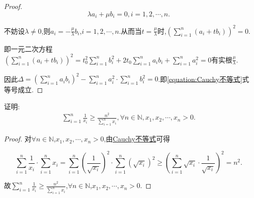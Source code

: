 \documentclass[lang=cn,newtx,10pt,scheme=chinese]{elegantbook}
\begin{document}
\begin{proof}
\[
\lambda a_i + \mu b_i = 0,  i = 1,2,\cdots,n.
\]

不妨设\(\lambda \neq 0\),则\(a_i = -\frac{\mu}{\lambda}b_i\),\(i = 1,2,\cdots,n\).从而当\(t = \frac{\mu}{\lambda}\)时,\(\left(\sum\limits_{i = 1}^{n}(a_i + tb_i)\right)^2 = 0\).

即一元二次方程\(\left(\sum\limits_{i = 1}^{n}(a_i + tb_i)\right)^2 = t_{0}^{2}\sum\limits_{i = 1}^{n}b_{i}^{2} + 2t_0\sum\limits_{i = 1}^{n}a_ib_i + \sum\limits_{i = 1}^{n}a_{i}^{2} = 0\)有实根\(\frac{\mu}{\lambda}\).

因此\(\Delta = \left(\sum\limits_{i = 1}^{n}a_ib_i\right)^2 - \sum\limits_{i = 1}^{n}a_{i}^{2} \cdot \sum\limits_{i = 1}^{n}b_{i}^{2} = 0\).即\eqref{equation:Cauchy不等式}式等号成立.
\end{proof}

\begin{example}
证明:\begin{align*}
\sum\limits_{i=1}^n{\frac{1}{x_i}}\geqslant \frac{n^2}{\sum\limits_{i=1}^n{x_i}},\forall n\in \mathbb{N} ,x_1,x_2,\cdots ,x_n>0.
\end{align*}
\end{example}
\begin{proof}
对\(\forall n \in \mathbb{N}\),\(x_1,x_2,\cdots,x_n > 0\),由\hyperref[theorem:Cauchy不等式]{Cauchy不等式}可得

\[
\sum\limits_{i = 1}^{n}\frac{1}{x_i} \cdot \sum\limits_{i = 1}^{n}x_i = \sum\limits_{i = 1}^{n}\left(\frac{1}{\sqrt{x_i}}\right)^2 \cdot \sum\limits_{i = 1}^{n}\left(\sqrt{x_i}\right)^2 \geqslant \left(\sum\limits_{i = 1}^{n}\sqrt{x_i} \cdot \frac{1}{\sqrt{x_i}}\right)^2 = n^2.
\]

故\(\sum\limits_{i = 1}^{n}\frac{1}{x_i} \geqslant \frac{n^2}{\sum\limits_{i = 1}^{n}x_i}\),\(\forall n \in \mathbb{N}\),\(x_1,x_2,\cdots,x_n > 0\). 
\end{proof}
\end{document}
